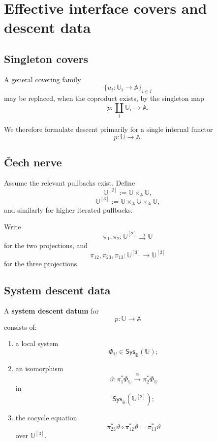 \section{Effective interface covers and descent data}
\label{sec:effective-interface-covers-descent-data}

\subsection{Singleton covers}
\label{subsec:singleton-interface-covers}

A general covering family
\[
    \{u_i:\mathbb U_i\to\mathbb A\}_{i\in I}
\]
may be replaced, when the coproduct exists, by the singleton map
\[
    p:
    \coprod_i\mathbb U_i
    \to
    \mathbb A.
\]

We therefore formulate descent primarily for a single internal functor
\[
    p:\mathbb U\to\mathbb A.
\]

\subsection{\v{C}ech nerve}
\label{subsec:cech-nerve-interface-cover}

Assume the relevant pullbacks exist. Define
\[
    \mathbb U^{[2]}
    :=
    \mathbb U\times_{\mathbb A}\mathbb U,
\]
\[
    \mathbb U^{[3]}
    :=
    \mathbb U\times_{\mathbb A}
    \mathbb U\times_{\mathbb A}\mathbb U,
\]
and similarly for higher iterated pullbacks.

Write
\[
    \pi_1,\pi_2:
    \mathbb U^{[2]}\rightrightarrows\mathbb U
\]
for the two projections, and
\[
    \pi_{12},\pi_{23},\pi_{13}:
    \mathbb U^{[3]}\to\mathbb U^{[2]}
\]
for the three projections.

\subsection{System descent data}
\label{subsec:system-descent-data}

\begin{definition}
\label{def:system-descent-datum}
A \textbf{system descent datum} for
\[
    p:\mathbb U\to\mathbb A
\]
consists of:
\begin{enumerate}
    \item a local system
    \[
        \Phi_{\mathbb U}
        \in
        \mathsf{Sys}_{\mathbb B}(\mathbb U);
    \]
    \item an isomorphism
    \[
        \vartheta:
        \pi_1^\ast\Phi_{\mathbb U}
        \xrightarrow{\cong}
        \pi_2^\ast\Phi_{\mathbb U}
    \]
    in
    \[
        \mathsf{Sys}_{\mathbb B}(\mathbb U^{[2]});
    \]
    \item the cocycle equation
    \[
        \pi_{23}^\ast\vartheta
        \circ
        \pi_{12}^\ast\vartheta
        =
        \pi_{13}^\ast\vartheta
    \]
    over \(\mathbb U^{[3]}\).
\end{enumerate}
\end{definition}

